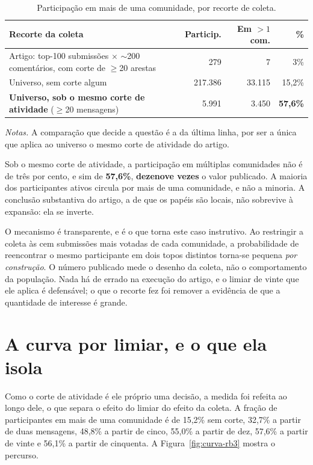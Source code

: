 \begin{table}[htbp]
\centering\footnotesize
\caption[Participação em mais de uma comunidade, por recorte de coleta]{Participação
em mais de uma comunidade, por recorte de coleta.}
\label{tab:reddit-rb3}
\begin{tabularx}{\textwidth}{@{}Xrrr@{}}
\toprule
Recorte da coleta & Particip. & Em $>1$ com. & \% \\
\midrule
Artigo: top-100 submissões $\times$ $\sim$200 comentários, com corte de $\geq$20 arestas & 279 & 7 & 3\% \\
\addlinespace[2pt]
Universo, sem corte algum & 217.386 & 33.115 & 15,2\% \\
\addlinespace[2pt]
\textbf{Universo, sob o mesmo corte de atividade} ($\geq$20 mensagens) & 5.991 & 3.450 & \textbf{57,6\%} \\
\bottomrule
\end{tabularx}

\vspace{2pt}
{\footnotesize \textit{Notas.} A comparação que decide a questão é a da última linha,
por ser a única que aplica ao universo o mesmo corte de atividade do artigo.\par}
\end{table}

Sob o mesmo corte de atividade, a participação em múltiplas comunidades não é de três
por cento, e sim de \textbf{57,6\%}, \textbf{dezenove vezes} o valor publicado. A
maioria dos participantes ativos circula por mais de uma comunidade, e não a minoria.
A conclusão substantiva do artigo, a de que os papéis são locais, não sobrevive à
expansão: ela se inverte.

O mecanismo é transparente, e é o que torna este caso instrutivo. Ao restringir a
coleta às cem submissões mais votadas de cada comunidade, a probabilidade de reencontrar
o mesmo participante em dois topos distintos torna-se pequena \emph{por construção}. O
número publicado mede o desenho da coleta, não o comportamento da população. Nada há de
errado na execução do artigo, e o limiar de vinte que ele aplica é defensável; o que o
recorte fez foi remover a evidência de que a quantidade de interesse é grande.

\section{A curva por limiar, e o que ela isola}
\label{sec:rb3-curva}

Como o corte de atividade é ele próprio uma decisão, a medida foi refeita ao longo dele,
o que separa o efeito do limiar do efeito da coleta. A fração de participantes em mais
de uma comunidade é de 15,2\% sem corte, 32,7\% a partir de duas mensagens, 48,8\% a
partir de cinco, 55,0\% a partir de dez, 57,6\% a partir de vinte e 56,1\% a partir de
cinquenta. A Figura~\ref{fig:curva-rb3} mostra o percurso.


